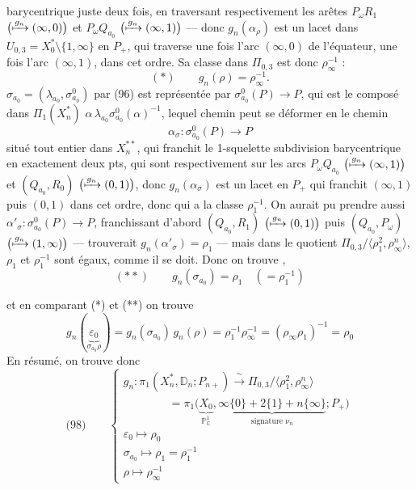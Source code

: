 \documentclass[11pt,a4paper]{article}
\begin{document}
barycentrique juste deux fois, \struck{\ill{}} en traversant respectivement les arêtes $P_\omega R_1$ $\bigl(\xmapsto{g_n} (\infty,0)\bigr)$ et $P_\omega Q_{a_0}$ $\bigl(\xmapsto{g_n} (\infty,1)\bigr)$ — donc $g_n(\alpha_\rho)$ est un lacet dans $U_{0,3} = X_0^* \setminus \{1,\infty\}$  en $P_+$, qui  traverse une fois l'arc $(\infty,0)$ de l'équateur, une fois l'arc $(\infty,1)$, dans cet ordre. Sa classe dans $\Pi_{0,3}$ est donc $\rho_\infty^{-1}$ :
\[
  (*)\qquad g_n(\rho) = \rho_\infty^{-1} .
\]
  $\sigma_{a_0} = (\lambda_{a_0}, \sigma_{a_0}^0)$ par (96) est représentée par $\sigma_{a_0}^0(P) \to P$, qui est le composé dans $\Pi_1(X_n^*)$ \struck{\ill{}} $\alpha\, \lambda_{a_0} \sigma_{a_0}^0(\alpha)^{-1}$, lequel chemin peut se déformer en le chemin \struck{\ill{}}
\[
  \alpha_\sigma : \sigma_{a_0}^0(P) \longrightarrow P
\]
situé tout entier dans $X_n^{**}$, qui franchit le 1-squelette  subdivision barycentrique en exactement deux pts, qui sont respectivement sur les arcs $P_\omega Q_{a_0}$ $\bigl(\xmapsto{g_n} (\infty,1)\bigr)$ et $(Q_{a_0}, R_0)$ $\bigl(\xmapsto{g_n} (0,1)\bigr)$, donc $g_n(\alpha_\sigma)$ est un lacet en $P_+$ qui franchit $(\infty,1)$ puis $(0,1)$ dans cet ordre, donc qui  a la classe $\rho_1^{-1}$.  On aurait pu prendre aussi $\alpha'_\sigma : \sigma_{a_0}^0(P) \to P$, franchissant d'abord $(Q_{a_0}, R_1)$ $\bigl(\xmapsto{g_n} (0,1)\bigr)$ puis $(Q_{a_0}, P_\omega)$ $\bigl(\xmapsto{g_n} (1,\infty)\bigr)$ —  trouverait $g_n(\alpha'_\sigma) = \rho_1$ — mais dans le quotient $\Pi_{0,3}/\langle \rho_1^2, \rho_\infty^n \rangle$, $\rho_1$ et $\rho_1^{-1}$ sont égaux, comme il se doit. Donc on trouve ,
\[
  (**)\qquad g_n(\sigma_{a_0}) = \rho_1 \quad (= \rho_1^{-1})
\]

et en comparant (*) et (**) on trouve
\[
  g_n(\underbrace{\varepsilon_0}_{\sigma_{a_0}\rho}) = g_n(\sigma_{a_0})\, g_n(\rho) = \rho_1^{-1}\rho_\infty^{-1} = (\rho_\infty\rho_1)^{-1} = \rho_0
\]
En résumé, on trouve donc
\[
  \text{(98)}\qquad
  \begin{cases}
    g_n : \pi_1(X_n^*, \mathbb{D}_n ; P_{n+}) \xrightarrow{\ \sim\ } \Pi_{0,3}/\langle \rho_1^2, \rho_\infty^n \rangle \\
    \qquad\qquad = \pi_1\bigl(\underbrace{X_0}_{\mathbb{P}^1_{\mathbb{C}}}, \underbrace{\infty\{0\} + 2\{1\} + n\{\infty\}}_{\text{signature } \nu_n} ; P_+\bigr) \\
    \varepsilon_0 \longmapsto \rho_0 \\
    \sigma_{a_0} \longmapsto \rho_1 = \rho_1^{-1} \\
    \rho \longmapsto \rho_\infty^{-1}
  \end{cases}
\]
\end{document}
